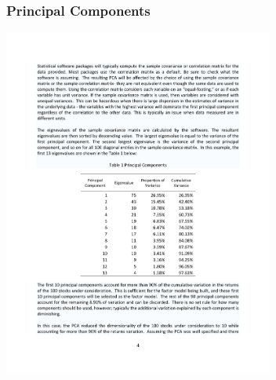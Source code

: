 \documentclass[xcolor=pdftex,dvipsnames,table,mathserif]{beamer}
\begin{document}
\begin{frame}
\frametitle{Principal Components}
\begin{center}
\includegraphics[width=3.5in]{./resources/princomp2}
\end{center}
\end{frame}
\end{document}
